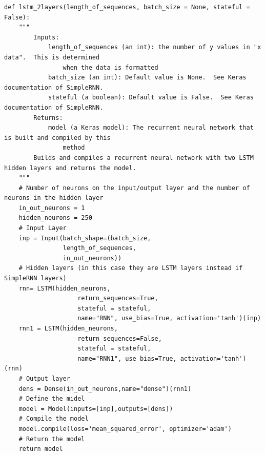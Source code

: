 \documentclass[%
oneside,                 %
final,                   %
10pt]{article}
\begin{document}
\begin{verbatim}
def lstm_2layers(length_of_sequences, batch_size = None, stateful = False):
    """
        Inputs:
            length_of_sequences (an int): the number of y values in "x data".  This is determined
                when the data is formatted
            batch_size (an int): Default value is None.  See Keras documentation of SimpleRNN.
            stateful (a boolean): Default value is False.  See Keras documentation of SimpleRNN.
        Returns:
            model (a Keras model): The recurrent neural network that is built and compiled by this
                method
        Builds and compiles a recurrent neural network with two LSTM hidden layers and returns the model.
    """
    # Number of neurons on the input/output layer and the number of neurons in the hidden layer
    in_out_neurons = 1
    hidden_neurons = 250
    # Input Layer
    inp = Input(batch_shape=(batch_size, 
                length_of_sequences, 
                in_out_neurons)) 
    # Hidden layers (in this case they are LSTM layers instead if SimpleRNN layers)
    rnn= LSTM(hidden_neurons, 
                    return_sequences=True,
                    stateful = stateful,
                    name="RNN", use_bias=True, activation='tanh')(inp)
    rnn1 = LSTM(hidden_neurons, 
                    return_sequences=False,
                    stateful = stateful,
                    name="RNN1", use_bias=True, activation='tanh')(rnn)
    # Output layer
    dens = Dense(in_out_neurons,name="dense")(rnn1)
    # Define the midel
    model = Model(inputs=[inp],outputs=[dens])
    # Compile the model
    model.compile(loss='mean_squared_error', optimizer='adam')  
    # Return the model
    return model


\end{verbatim}
\end{document}
